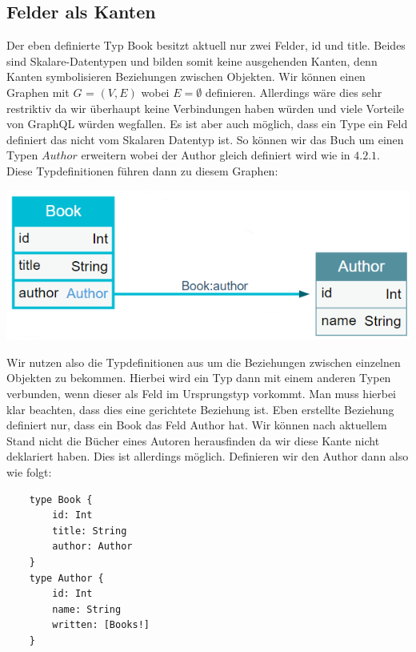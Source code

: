 \subsection{Felder als Kanten}

Der eben definierte Typ Book besitzt aktuell nur zwei Felder, id und title.
Beides sind Skalare-Datentypen und bilden somit keine ausgehenden Kanten, denn Kanten symbolisieren Beziehungen zwischen Objekten.
Wir können einen Graphen mit $G$ = $(V,E)$ wobei $E =\emptyset$ definieren.
Allerdings wäre dies sehr restriktiv da wir überhaupt keine Verbindungen haben würden und viele Vorteile von GraphQL würden wegfallen.
Es ist aber auch möglich, dass ein Type ein Feld definiert das nicht vom Skalaren Datentyp ist.
So können wir das Buch um einen Typen $Author$ erweitern wobei der Author gleich definiert wird wie in $4.2.1$.
Diese Typdefinitionen führen dann zu diesem Graphen:

\begin{center}
    \includegraphics[width=\textwidth,height=\textheight,keepaspectratio]{img/book-author}
\end{center}

Wir nutzen also die Typdefinitionen aus um die Beziehungen zwischen einzelnen Objekten zu bekommen.
Hierbei wird ein Typ dann mit einem anderen Typen verbunden, wenn dieser als Feld im Ursprungstyp vorkommt.
Man muss hierbei klar beachten, dass dies eine gerichtete Beziehung ist.
Eben erstellte Beziehung definiert nur, dass ein Book das Feld Author hat. Wir können nach aktuellem Stand nicht
die Bücher eines Autoren herausfinden da wir diese Kante nicht deklariert haben.
Dies ist allerdings möglich. Definieren wir den Author dann also wie folgt:

\begin{verbatim}
    type Book {
        id: Int
        title: String
        author: Author
    }
    type Author {
        id: Int
        name: String
        written: [Books!]
    }
\end{verbatim}

